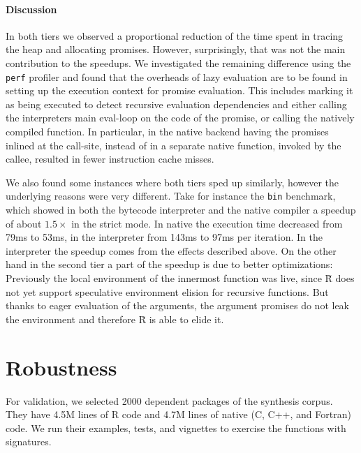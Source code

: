 \documentclass[review,nonacm,screen,acmsmall,anonymous=true]{acmart}
\renewcommand{\Rsh}{{\sf\u R}\xspace}
\begin{document}
\paragraph{Discussion}

In both tiers we observed a proportional reduction of the time spent in tracing
the heap and allocating promises.
However, surprisingly, that was not the main contribution to the speedups.
We investigated the remaining difference using the \lstinline{perf} profiler
and found that the overheads of lazy evaluation are to be found in setting up the
execution context for promise evaluation. This includes marking it as being
executed to detect recursive evaluation dependencies and either calling the interpreters
main eval-loop on the code of the promise, or calling the natively compiled
function. In particular, in the native backend having the promises inlined at the
call-site, instead of in a separate native function, invoked by the callee,
resulted in fewer instruction cache misses.

We also found some instances where both tiers sped up similarly,
however the underlying reasons were very different.
Take for instance the \lstinline{bin} benchmark, which showed in both
the bytecode interpreter and the native compiler a speedup of about $1.5\times$
in the strict mode. In native the execution time decreased from 79ms to 53ms, in
the interpreter from 143ms to 97ms per iteration. In the interpreter the speedup
comes from the effects described above. On the other hand in the second tier
a part of the speedup is due to better optimizations: Previously the local
environment of the innermost function was live, since \Rsh does not yet
support speculative environment elision for recursive functions. But thanks to eager
evaluation of the arguments, the argument promises do not leak the environment
and therefore \Rsh is able to elide it.

\section{Robustness}

For validation, we selected 2000 dependent packages of the synthesis
corpus. They have 4.5M lines of R code and 4.7M lines of native (C, C++, and
Fortran) code. We run their examples, tests, and vignettes to exercise the
functions with signatures.

%
\end{document}
